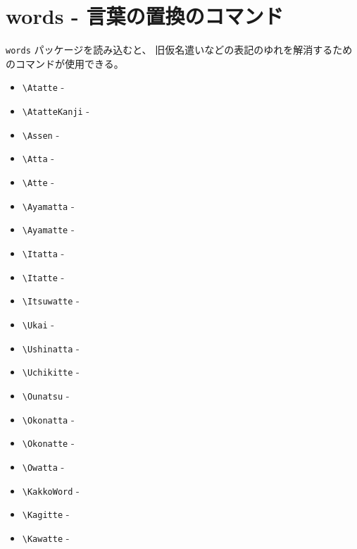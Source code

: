 \documentclass[oneside,10pt,a4paper]{jsarticle}
\begin{document}
  \newpage

  \section{words - 言葉の置換のコマンド}

  \verb|words| パッケージを読み込むと、
  旧仮名遣いなどの表記のゆれを解消するためのコマンドが使用できる。

  \begin{itemize}
    \item \verb|\Atatte| - 
    \item \verb|\AtatteKanji| - 
    \item \verb|\Assen| - 
    \item \verb|\Atta| - 
    \item \verb|\Atte| - 
    \item \verb|\Ayamatta| - 
    \item \verb|\Ayamatte| - 
    \item \verb|\Itatta| - 
    \item \verb|\Itatte| - 
    \item \verb|\Itsuwatte| - 
    \item \verb|\Ukai| - 
    \item \verb|\Ushinatta| - 
    \item \verb|\Uchikitte| - 
    \item \verb|\Ounatsu| - 
    \item \verb|\Okonatta| - 
    \item \verb|\Okonatte| - 
    \item \verb|\Owatta| - 
    \item \verb|\KakkoWord| - 
    \item \verb|\Kagitte| - 
    \item \verb|\Kawatte| - 

\end{itemize}
\end{document}
